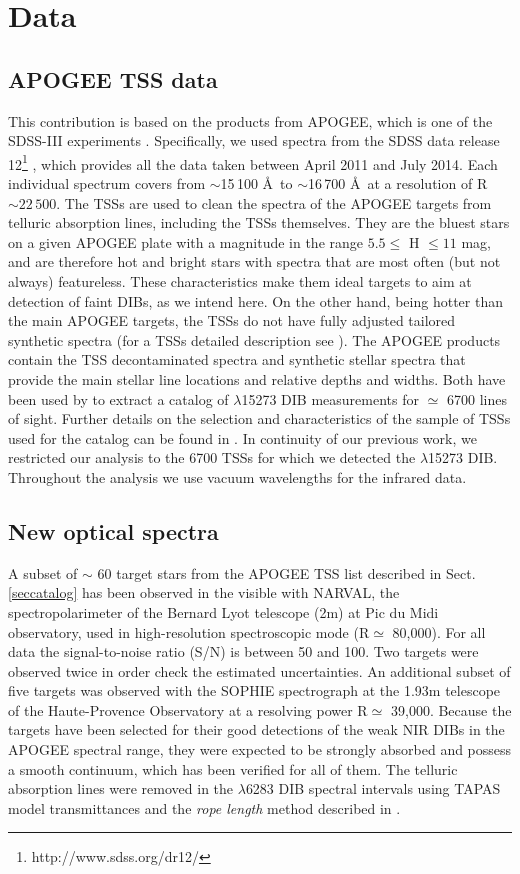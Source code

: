 \documentclass[printer]{aa} %
\begin{document}
\section{Data\label{secdata}}
\subsection{APOGEE TSS data}
This contribution is based on the products from APOGEE, which is one of the SDSS-III experiments \citep{Eisenstein11,Aihara11}. Specifically, we used spectra from the 
SDSS data release 12\footnote{http://www.sdss.org/dr12/} \citep[DR12][]{Alam15}, which provides all the data taken between 
April 2011 and July 2014. Each individual spectrum covers from $\sim$15\,100 \AA\, to $\sim$16\,700 \AA\, at a resolution of R$\sim22\,500$.
The TSSs are used to clean the spectra of the APOGEE targets from telluric absorption lines, including the TSSs themselves. They are the bluest stars on a given APOGEE plate with a magnitude in 
the range $5.5\le$ H $\le11$ mag, and are therefore hot and bright stars with spectra that are most often (but not always) featureless. These characteristics make 
them ideal targets to aim at detection of faint DIBs, as we intend here. On the other hand, being hotter than the main APOGEE targets, the TSSs do not have fully adjusted tailored synthetic spectra \citep{Garcia15} (for a TSSs detailed description see \citet{Zasowski13}).
The APOGEE products contain the TSS decontaminated spectra and synthetic stellar spectra that provide the main stellar line locations and relative depths and widths. Both have been used by \citet{Elyajouri16} to extract a catalog of $\lambda$15273 DIB measurements 
for $\simeq$ 6700 lines of sight.  Further details on the selection and characteristics of the sample of TSSs used for the catalog can be found in \citet[][ and references therein]{Elyajouri16}. In continuity of our previous work, we restricted our analysis to the 6700 TSSs for which we detected the $\lambda$15273 DIB. Throughout the analysis we use vacuum wavelengths for the infrared data. 
\subsection{New optical spectra}
A subset of $\sim$ 60 target stars  from the APOGEE TSS list described in Sect. \ref{seccatalog} has been observed in the visible with NARVAL, the spectropolarimeter of the Bernard Lyot telescope (2m) at Pic du Midi observatory, used in high-resolution spectroscopic mode (R$\simeq$ 80,000).  For all data the signal-to-noise ratio (S/N) is between 50 and 100.  Two targets were observed twice in order check the estimated uncertainties. An additional subset of five targets was observed with the SOPHIE spectrograph at the 1.93m telescope of the Haute-Provence Observatory at a resolving power R$\simeq$ 39,000. Because the targets have been selected for their good detections of the weak NIR DIBs in the APOGEE spectral range, they were expected to be strongly absorbed and possess a smooth continuum, which has been verified for all of them. The telluric absorption lines were removed in the $\lambda$6283 DIB spectral intervals using TAPAS model transmittances \citep{Bertaux14} and the {\it \textup{rope length}} method described in 
\cite{Raimond12}. 
\end{document}
